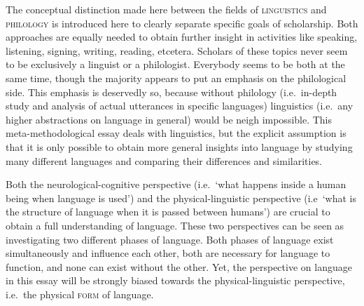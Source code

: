 
%
The conceptual distinction made here between the fields of \textsc{linguistics} and \textsc{philology} is introduced here to clearly separate specific goals of scholarship. Both approaches are equally needed to obtain further insight in activities like speaking, listening, signing, writing, reading, etcetera. Scholars of these topics never seem to be exclusively a linguist or a philologist. Everybody seems to be both at the same time, though the majority appears to put an emphasis on the philological side. This emphasis is deservedly so, because without philology (i.e.~in-depth study and analysis of actual utterances in specific languages) linguistics (i.e.~any higher abstractions on language in general) would be neigh impossible. This meta-methodological essay deals with linguistics, but the explicit assumption is that it is only possible to obtain more general insights into language by studying many different languages and comparing their differences and similarities. 


%
Both the neurological-cognitive perspective (i.e.~`what happens inside a human being when language is used') and the physical-linguistic perspective (i.e~`what is the structure of language when it is passed between humans') are crucial to obtain a full understanding of language. These two perspectives can be seen as investigating two different phases of language. Both phases of language exist simultaneously and influence each other, both are necessary for language to function, and none can exist without the other. Yet, the perspective on language in this essay will be strongly biased towards the physical-linguistic perspective, i.e.~the physical \textsc{form} of language.

